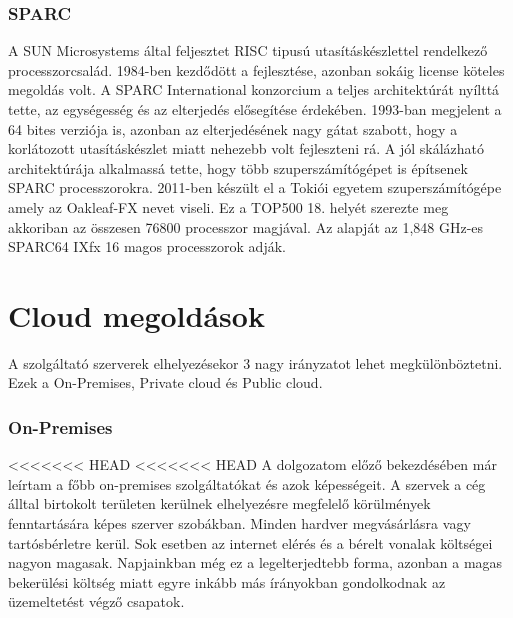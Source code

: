 \documentclass[12pt,oneside,justify,table]{book}
\begin{document}
\subsubsection{SPARC}
A SUN Microsystems által feljesztet RISC tipusú utasításkészlettel rendelkező processzorcsalád. 1984-ben kezdődött a fejlesztése, azonban sokáig license köteles megoldás volt. A SPARC International konzorcium a teljes architektúrát nyílttá tette, az egységesség és az elterjedés elősegítése érdekében. 1993-ban megjelent a 64 bites verziója is, azonban az elterjedésének nagy gátat szabott, hogy a korlátozott utasításkészlet miatt nehezebb volt fejleszteni rá. A jól skálázható architektúrája alkalmassá tette, hogy több szuperszámítógépet is építsenek SPARC processzorokra. 2011-ben készült el a Tokiói egyetem szuperszámítógépe amely az Oakleaf-FX nevet viseli. Ez a TOP500 18. helyét szerezte meg akkoriban az összesen 76800 processzor magjával. Az alapját az 1,848 GHz-es SPARC64 IXfx  16 magos processzorok adják. \cite{SPARC}

\section{Cloud megoldások}
A szolgáltató szerverek elhelyezésekor 3 nagy irányzatot lehet megkülönböztetni. Ezek a On-Premises, Private cloud és Public cloud. 

\subsubsection{On-Premises} 
<<<<<<< HEAD
<<<<<<< HEAD
A dolgozatom előző bekezdésében már leírtam a főbb on-premises szolgáltatókat és azok képességeit. A szervek a cég álltal birtokolt területen kerülnek elhelyezésre megfelelő körülmények fenntartására képes szerver szobákban. Minden hardver megvásárlásra vagy tartósbérletre kerül. Sok esetben az internet elérés és a bérelt vonalak költségei nagyon magasak. Napjainkban még ez a legelterjedtebb forma, azonban a magas bekerülési költség miatt egyre inkább más írányokban gondolkodnak az üzemeltetést végző csapatok.
\end{document}
